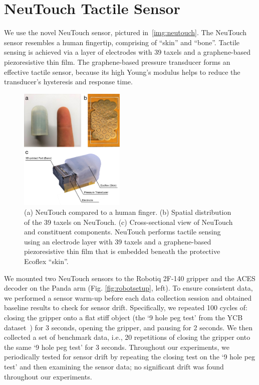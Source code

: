 \documentclass[fyp]{socreport}
\begin{document}
\section{NeuTouch Tactile Sensor}
We use the novel NeuTouch sensor, pictured in~\autoref{img:neutouch}. The
NeuTouch sensor resembles a human fingertip, comprising of ``skin'' and
``bone''. Tactile sensing is achieved via a layer of electrodes with 39 taxels
and a graphene-based piezoresistive thin film. The graphene-based pressure
transducer forms an effective tactile sensor, because its high Young's modulus
helps to reduce the transducer's hysteresis and response time.

\begin{figure}
\centering
\includegraphics[width=0.45\textwidth]{images/spktac}
\caption{(a) NeuTouch compared to a human finger. (b) Spatial distribution of
  the 39 taxels on NeuTouch. (c) Cross-sectional view of NeuTouch and
  constituent components. NeuTouch performs tactile sensing using an electrode
  layer with 39 taxels and a graphene-based piezoresistive thin film that is
  embedded beneath the protective Ecoflex ``skin''.}
\label{img:neutouch}
\end{figure}

We mounted two NeuTouch sensors to the Robotiq 2F-140 gripper and the ACES
decoder on the Panda arm (Fig. \ref{fig:robotsetup}, left). To ensure consistent
data, we performed a sensor warm-up before each data collection session and
obtained baseline results to check for sensor drift. Specifically, we repeated
100 cycles of: closing the gripper onto a flat stiff object (the `9 hole peg
test' from the YCB dataset~\cite{ycb2015}) for 3 seconds, opening the gripper,
and pausing for 2 seconds. We then collected a set of benchmark data, i.e., 20
repetitions of closing the gripper onto the same `9 hole peg test' for 3
seconds. Throughout our experiments, we periodically tested for sensor drift by
repeating the closing test on the `9 hole peg test' and then examining the
sensor data; no significant drift was found throughout our experiments.
\end{document}
